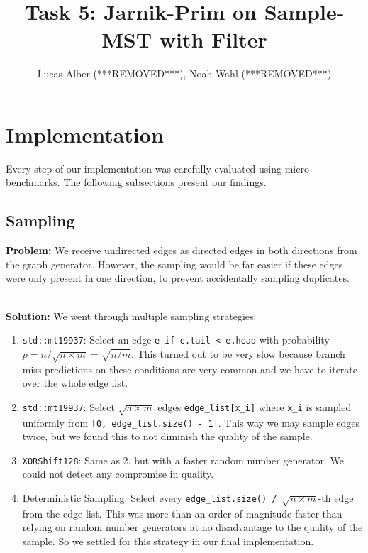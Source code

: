 \documentclass{article}
\begin{document}
\title{Task 5: Jarnik-Prim on Sample-MST with Filter}
\author{Lucas Alber (***REMOVED***), Noah Wahl (***REMOVED***)}
\maketitle

\section{Implementation}

Every step of our implementation was carefully evaluated using micro benchmarks. The following subsections present our findings.

\subsection{Sampling}
\textbf{Problem:} We receive undirected edges as directed edges in both directions from the graph generator.
However, the sampling would be far easier if these edges were only present in one direction, to prevent accidentally sampling duplicates.

\noindent \\
\textbf{Solution:} We went through multiple sampling strategies:

\begin{enumerate}
\item \texttt{std::mt19937}: Select an edge \texttt{e if e.tail < e.head} with probability $p = n / \sqrt{n \times m} = \sqrt{n / m}$.
This turned out to be very slow because branch miss-predictions on these conditions are very common and we have to iterate over the whole edge list.

\item \texttt{std::mt19937}: Select $\sqrt{n \times m}$ edges \texttt{edge\_list[x\_i]} where \texttt{x\_i} is sampled uniformly from \texttt{[0, edge\_list.size() - 1]}.
This way we may sample edges twice, but we found this to not diminish the quality of the sample.

\item \texttt{XORShift128}: Same as 2. but with a faster random number generator.
We could not detect any compromise in quality.

\item Deterministic Sampling: Select every \texttt{edge\_list.size() / $\sqrt{n \times m}$}-th edge from the edge list.
This was more than an order of magnitude faster than relying on random number generators at no disadvantage to the quality of the sample.
So we settled for this strategy in our final implementation.
\end{enumerate}
\end{document}

